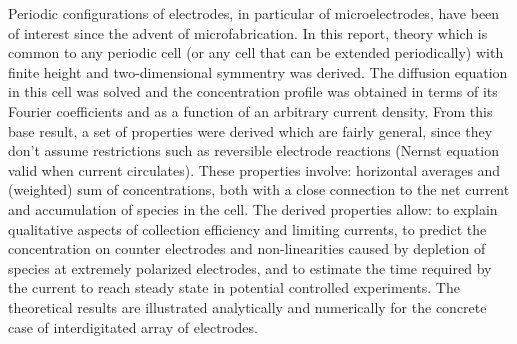 Periodic configurations of electrodes, in particular of microelectrodes,
have been of interest since the advent of microfabrication.
In this report, theory which is common to any periodic cell
(or any cell that can be extended periodically)
with finite height and two-dimensional symmentry was derived.
The diffusion equation in this cell was solved
and the concentration profile was obtained
in terms of its Fourier coefficients
and as a function of an arbitrary current density.
From this base result, a set of properties were derived
which are fairly general, since they don't assume restrictions
such as reversible electrode reactions
(Nernst equation valid when current circulates).
These properties involve:
horizontal averages and (weighted) sum of concentrations,
both with a close connection to the net current
and accumulation of species in the cell.
The derived properties allow:
to explain qualitative aspects of collection efficiency and limiting currents,
to predict the concentration on counter electrodes and non-linearities
caused by depletion of species at extremely polarized electrodes,
and to estimate the time required by the current to reach steady state
in potential controlled experiments.
The theoretical results are illustrated analytically
and numerically for the concrete case of interdigitated array of electrodes.
